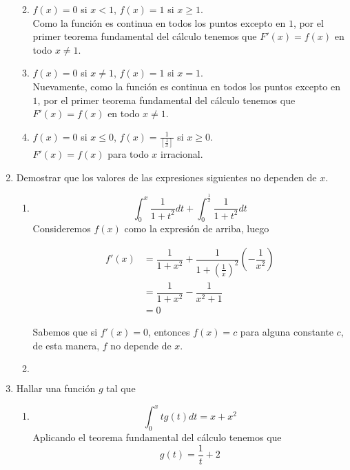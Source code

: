 \documentclass{report}
\begin{document}
\begin{enumerate}[label=\textcolor{Red}{\textbf{\arabic*.}}]
        \begin{enumerate}[label=\textcolor{Red}{\textbf{\roman*.}}]
            \setcounter{enumii}{1}
            \item $f(x) = 0$ si $x < 1$, $f(x) = 1$ si $x \geq 1$.\\
            Como la función es continua en todos los puntos excepto en $1$, por el primer teorema fundamental del cálculo tenemos que $F'(x) = f(x)$ en todo $x \not = 1$.
            \item $f(x) = 0$ si $x \not = 1$, $f(x) = 1$ si $x = 1$.\\
            Nuevamente, como la función es continua en todos los puntos excepto en $1$, por el primer teorema fundamental del cálculo tenemos que $F'(x) = f(x)$ en todo $x \not = 1$.
            \setcounter{enumii}{5}
            \item $f(x) = 0$ si $x \leq 0$, $f(x) = \frac{1}{\left[\frac{1}{x}\right]}$ si $x \geq 0$.\\
            $F'(x) = f(x)$ para todo $x$ irracional.
        \end{enumerate}

        \setcounter{enumi}{3}
        \item Demostrar que los valores de las expresiones siguientes no dependen de $x$.

        \begin{enumerate}[label=\textcolor{Red}{\textbf{\roman*.}}]
            \item $$\int_{0}^{x}\dfrac{1}{1+t^2}dt + \int_{0}^{\frac{1}{x}}\dfrac{1}{1+t^2}dt$$
            Consideremos $f(x)$ como la expresión de arriba, luego

            \begin{align*}
                f'(x) &= \dfrac{1}{1+x^2} + \dfrac{1}{1+(\frac{1}{x})^2}\left(-\dfrac{1}{x^2}\right)\\
                &= \dfrac{1}{1+x^2}-\dfrac{1}{x^2+1}\\
                &= 0
            \end{align*}

            Sabemos que si $f'(x) = 0$, entonces $f(x) = c$ para alguna constante $c$, de esta manera, $f$ no depende de $x$.

            \item $$$$
        \end{enumerate}
        \setcounter{enumi}{5}
        \item Hallar una función $g$ tal que
        \begin{enumerate}[label=\textcolor{Red}{\textbf{\roman*.}}]
            \item $$ \int_{0}^{x} tg(t)dt = x + x^2$$
            Aplicando el teorema fundamental del cálculo tenemos que
            $$g(t) = \frac{1}{t}+2$$
        \end{enumerate}


\end{enumerate}
\end{document}

